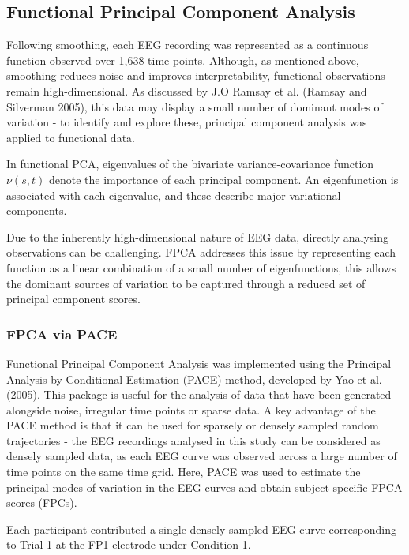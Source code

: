 \documentclass{article}
\begin{document}
\subsection{Functional Principal Component
Analysis}\label{functional-principal-component-analysis}

Following smoothing, each EEG recording was represented as a continuous
function observed over 1,638 time points. Although, as mentioned above,
smoothing reduces noise and improves interpretability, functional
observations remain high-dimensional. As discussed by J.O Ramsay et al.
(Ramsay and Silverman 2005), this data may display a small number of
dominant modes of variation - to identify and explore these, principal
component analysis was applied to functional data.

In functional PCA, eigenvalues of the bivariate variance-covariance
function \(\nu(s,t)\) denote the importance of each principal component.
An eigenfunction is associated with each eigenvalue, and these describe
major variational components.

Due to the inherently high-dimensional nature of EEG data, directly
analysing observations can be challenging. FPCA addresses this issue by
representing each function as a linear combination of a small number of
eigenfunctions, this allows the dominant sources of variation to be
captured through a reduced set of principal component scores.

\subsubsection{FPCA via PACE}\label{fpca-via-pace}

Functional Principal Component Analysis was implemented using the
Principal Analysis by Conditional Estimation (PACE) method, developed by
Yao et al. (2005). This package is useful for the analysis of data that
have been generated alongside noise, irregular time points or sparse
data. A key advantage of the PACE method is that it can be used for
sparsely or densely sampled random trajectories - the EEG recordings
analysed in this study can be considered as densely sampled data, as
each EEG curve was observed across a large number of time points on the
same time grid. Here, PACE was used to estimate the principal modes of
variation in the EEG curves and obtain subject-specific FPCA scores
(FPCs).

Each participant contributed a single densely sampled EEG curve
corresponding to Trial 1 at the FP1 electrode under Condition 1.
\end{document}
